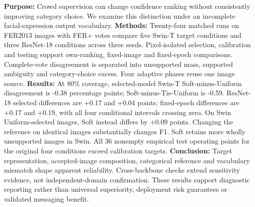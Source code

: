 \textbf{Purpose:} Crowd supervision can change confidence ranking without consistently improving category choice. We examine this distinction under an incomplete facial-expression output vocabulary.
\textbf{Methods:} Twenty-four matched runs on FER2013 images with FER+ votes compare five Swin-T target conditions and three ResNet-18 conditions across three seeds. Pixel-isolated selection, calibration and testing support own-ranking, fixed-image and fixed-epoch comparisons. Complete-vote disagreement is separated into unsupported mass, supported ambiguity and category-choice excess. Four adaptive phases reuse one image source.
\textbf{Results:} At 80\% coverage, selected-model Swin-T Soft-minus-Uniform disagreement is -0.38 percentage points; Soft-minus-Tie-Uniform is -0.59. ResNet-18 selected differences are +0.17 and +0.04 points; fixed-epoch differences are +0.17 and +0.19, with all four conditional intervals crossing zero. On Swin Uniform-selected images, Soft instead differs by +0.09 points. Changing the reference on identical images substantially changes F1. Soft retains more wholly unsupported images in Swin. All 36 nonempty empirical test operating points for the original four conditions exceed calibration targets.
\textbf{Conclusion:} Target representation, accepted-image composition, categorical reference and vocabulary mismatch shape apparent reliability. Cross-backbone checks extend sensitivity evidence, not independent-domain confirmation. These results support diagnostic reporting rather than universal superiority, deployment risk guarantees or validated messaging benefit.
